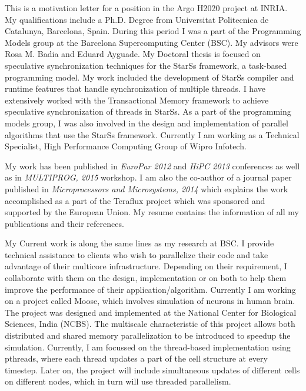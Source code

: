 \documentclass[10pt,stdletter,dateno]{newlfm}
\begin{document}
\begin{newlfm}
	   This is a motivation letter for a position in the Argo H2020 project at INRIA.
	   My qualifications include a Ph.D. Degree from Universitat Politecnica de Catalunya, Barcelona, Spain. 
	   During this period I was a part of the Programming Models group at the Barcelona Supercomputing Center (BSC). 
	   My advisors were Rosa M. Badia and Eduard Ayguade. 
	   My Doctoral thesis is focused on speculative synchronization techniques for the StarSs framework, a task-based programming model.
	   My work included the development of StarSs compiler and runtime features that handle synchronization of multiple threads.
	   I have extensively worked with the Transactional Memory framework to achieve speculative synchronization of threads in StarSs.
	   As a part of the programming models group, I was also involved in the design and implementation of parallel algorithms that use the StarSs framework.
	   Currently I am working as a Technical Specialist, High Performance Computing Group of Wipro Infotech. 
%
\par
	   My work has been published in \textit{EuroPar 2012} and \textit{HiPC 2013} conferences as well as in \textit{MULTIPROG, 2015} workshop.  
	   I am also the co-author of a journal paper published in \textit{Microprocessors and Microsystems, 2014} which explains the work accomplished as a part of the Teraflux project which was sponsored and supported by the European Union. 
	   My resume contains the information of all my publications and their references. 
%
\par
	   My Current work is along the same lines as my research at BSC. 
	   I provide technical assistance to clients who wish to parallelize their code and take advantage of their multicore infrastructure. 
	   Depending on their requirement, I collaborate with them on the design, implementation or on both to help them improve the performance of their application/algorithm.
	   Currently I am working on a project called Moose, which involves simulation of neurons in human brain. 
	   The project was designed and implemented at the National Center for Biological Sciences, India (NCBS). 
	   The multiscale characteristic of this project allows both distributed and shared memory parallelization to be introduced to speedup the simulation. 
	   Currently, I am focussed on the thread-based implementation using pthreads, where each thread updates a part of the cell structure at every timestep. 
	   Later on, the project will include simultaneous updates of different cells on different nodes, which in turn will use threaded parallelism. 

\end{newlfm}
\end{document}
